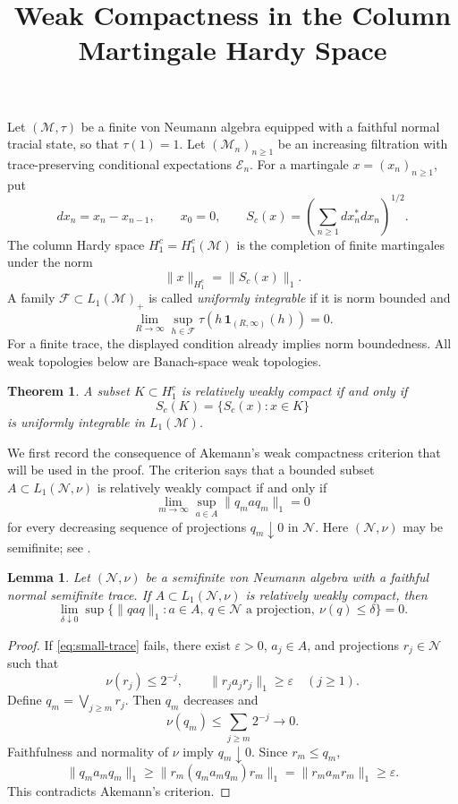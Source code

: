 \documentclass[11pt]{article}
\title{Weak Compactness in the Column Martingale Hardy Space}
\author{}
\date{}
\newtheorem{theorem}{Theorem}
\newtheorem{lemma}{Lemma}
\theoremstyle{remark}
\newcommand{\M}{\mathcal M}
\newcommand{\N}{\mathcal N}
\newcommand{\HH}{H_1^c}
\newcommand{\ind}{\mathbf 1}
\begin{document}
\maketitle

Let $(\M,\tau)$ be a finite von Neumann algebra equipped with a faithful
normal tracial state, so that $\tau(1)=1$. Let $(\M_n)_{n\geq 1}$ be an
increasing filtration with trace-preserving conditional expectations
$\mathcal E_n$. For a martingale $x=(x_n)_{n\geq 1}$, put
\[
  dx_n=x_n-x_{n-1},\qquad x_0=0,\qquad
  S_c(x)=\left(\sum_{n\geq 1}dx_n^*dx_n\right)^{1/2}.
\]
The column Hardy space $\HH=\HH(\M)$ is the completion of finite
martingales under the norm
\[
  \|x\|_{\HH}=\|S_c(x)\|_1.
\]
A family $\mathcal F\subset L_1(\M)_+$ is called \emph{uniformly
integrable} if it is norm bounded and
\[
  \lim_{R\to\infty}\sup_{h\in\mathcal F}
  \tau\!\left(h\,\ind_{(R,\infty)}(h)\right)=0.
\]
For a finite trace, the displayed condition already implies norm
boundedness. All weak topologies below are Banach-space weak topologies.

\begin{theorem}\label{thm:main}
A subset $K\subset \HH$ is relatively weakly compact if and only if
\[
  S_c(K)=\{S_c(x):x\in K\}
\]
is uniformly integrable in $L_1(\M)$.
\end{theorem}

We first record the consequence of Akemann's weak compactness criterion
that will be used in the proof. The criterion says that a bounded subset
$A\subset L_1(\N,\nu)$ is relatively weakly compact if and only if
\[
  \lim_{m\to\infty}\sup_{a\in A}\|q_m a q_m\|_1=0
\]
for every decreasing sequence of projections $q_m\downarrow 0$ in $\N$.
Here $(\N,\nu)$ may be semifinite; see \cite[Definition~2.4 and the
subsequent remarks]{Randrianantoanina}.

\begin{lemma}\label{lem:small-trace}
Let $(\N,\nu)$ be a semifinite von Neumann algebra with a faithful normal
semifinite trace. If $A\subset L_1(\N,\nu)$ is relatively weakly compact,
then
\begin{equation}\label{eq:small-trace}
  \lim_{\delta\downarrow 0}
  \sup\bigl\{\|qaq\|_1:
      a\in A,\ q\in\N\text{ a projection},\ \nu(q)\leq\delta\bigr\}=0.
\end{equation}
\end{lemma}

\begin{proof}
If \eqref{eq:small-trace} fails, there exist $\varepsilon>0$,
$a_j\in A$, and projections $r_j\in\N$ such that
\[
  \nu(r_j)\leq 2^{-j},
  \qquad \|r_j a_j r_j\|_1\geq\varepsilon
  \quad (j\geq 1).
\]
Define $q_m=\bigvee_{j\geq m}r_j$. Then $q_m$ decreases and
\[
  \nu(q_m)\leq\sum_{j\geq m}2^{-j}\longrightarrow 0.
\]
Faithfulness and normality of $\nu$ imply $q_m\downarrow 0$.
Since $r_m\leq q_m$,
\[
  \|q_m a_m q_m\|_1
  \geq\|r_m(q_m a_m q_m)r_m\|_1
  =\|r_m a_m r_m\|_1
  \geq\varepsilon.
\]
This contradicts Akemann's criterion.
\end{proof}
\end{document}
